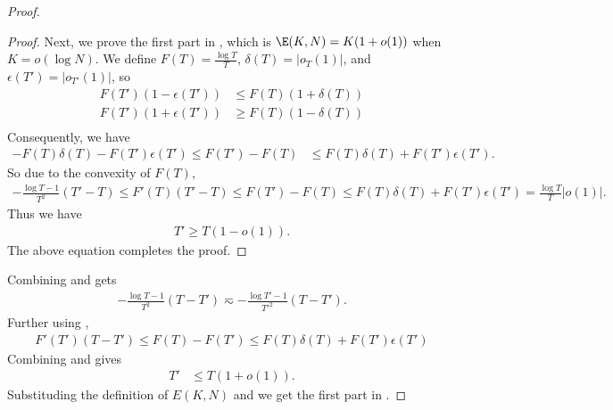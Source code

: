 \begin{proof}
\begin{proof}
Next, we prove the first part in , which is $\E(K,N) = K(1 + o(1))$ when $K = o(\log N)$. We define $F(T) = \frac{\log T}{T}$, $\delta(T)=|o_T(1)|$, and $\epsilon(T')=|o_{T'}(1)|$, so
\begin{align*}
    F(T')(1-\epsilon(T'))&\leq F(T)(1+\delta(T)) \\
    F(T')(1+\epsilon(T'))&\geq F(T)(1-\delta(T)) \\
\end{align*}
Consequently, we have 
\begin{align}
    -F(T)\delta(T)-F(T')\epsilon(T')\leq F(T')-F(T)&\leq F(T)\delta(T)+F(T')\epsilon(T'). \label{equ:T-T'-inequ}
\end{align}
So due to the convexity of $F(T)$,
\begin{align*}
    -\frac{\log T-1}{T^2}(T'-T)\leq F'(T)(T'-T)\leq F( T')-F(T)\leq F(T)\delta(T)+F(T')\epsilon(T')=\frac{\log T}{T}|o(1)|.
\end{align*}
Thus we have
\begin{align*}
    T' \geq T(1-o(1)).
\end{align*}
The above equation completes the proof.
\end{proof}

Combining  and  gets
\begin{align}
    -\frac{\log T-1}{T^2}(T-T')\eqsim-\frac{\log T'-1}{T'^2}(T-T'). \label{equ:T-approx-T'-coro}
\end{align}
Further using , 
\begin{align}   F'(T')(T-T')\leq F(T)-F(T')\leq F(T)\delta(T)+F(T')\epsilon(T') \label{equ:T-bigger-T'}
\end{align}
Combining  and  gives 
\begin{align*}
    T'&\leq T(1+o(1)).
\end{align*}
Substituding the definition of $E(K, N)$ and we get the first part in .


\end{proof}
